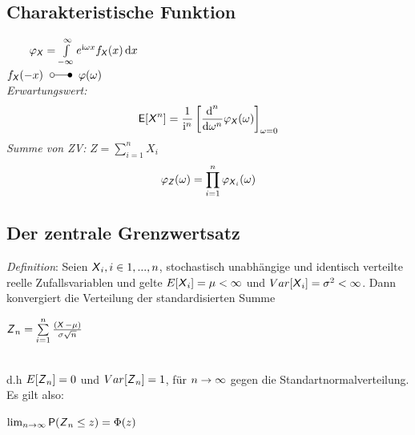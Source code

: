 \documentclass[german,color,6pt]{latex4ei/latex4ei_sheet}
\begin{document}
\begin{sectionbox}
	\subsection{Charakteristische Funktion} %
	\label{sub:charakteristische_funktion}
	 $\qquad \varphi_{\X} = \int\limits_{-\infty}^\infty e^{\i\omega x} f_{\X}(x) \diff x$\\
	$f_{\X}(-x) \T \varphi(\omega)$ \\
	
	\emph{Erwartungswert:}
	\begin{eqnarray*}
		\E[\X^n] = \frac{1}{\i^n} \left[\frac{\diff^n}{\diff \omega^n} \varphi_{\X}(\omega)\right]_{\omega = 0}
	\end{eqnarray*}
	\emph{Summe von ZV:} $Z=\sum_{i=1}^{n}X_i$
	\begin{eqnarray*}
		\varphi_{\operatorname{\textsf{\textit{Z}}}} (\omega) = \prod_{i=1}^{n} \varphi_{\operatorname{\textsf{\textit{X}}}_i} (\omega)
	\end{eqnarray*}
\end{sectionbox}	

\begin{sectionbox}
	\subsection{Der zentrale Grenzwertsatz}
	\emph{Definition}: Seien $\operatorname{\textsf{\textit{X}}}_i, i \in {1,...,n}$, stochastisch unabhängige und identisch
	verteilte reelle Zufallsvariablen und gelte $E[\operatorname{\textsf{\textit{X}}}_i] = \mu < \infty$ und $Var[\operatorname{\textsf{\textit{X}}}_i] = \sigma^2 < \infty$. 
	Dann konvergiert die Verteilung der standardisierten Summe\\ 
	\centerline{$\operatorname{\textsf{\textit{Z}}}_n= \sum\limits_{i=1}^{n}\frac{(\operatorname{\textsf{\textit{X}}}-\mu)}{\sigma\sqrt{n}}$} \\
	d.h $E[\operatorname{\textsf{\textit{Z}}}_n] = 0$ und $Var[\operatorname{\textsf{\textit{Z}}}_n] = 1$, für $n \rightarrow \infty$ gegen die Standartnormalverteilung. \\
	Es gilt also: \\
	\centerline{$\lim_{n \rightarrow \infty} \operatorname{\textsf{P}}({\operatorname{\textsf{\textit{Z}}}_n \le z}) = \Phi (z)$}
\end{sectionbox}	


\vfill

\end{document}
